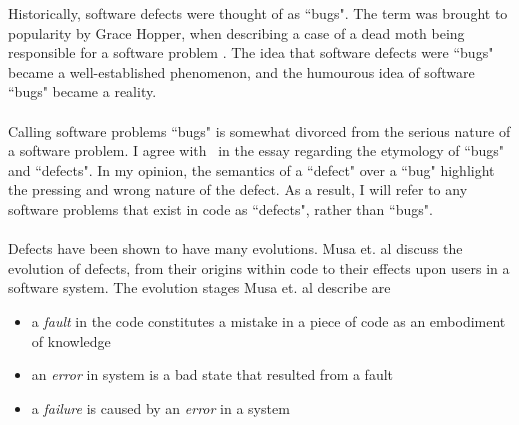 Historically, software defects were thought of as ``bugs".
The term was brought to popularity by Grace Hopper, when describing a case of a dead moth being
responsible for a software problem \FIXME.
The idea that software defects were ``bugs" became a well-established phenomenon, and the humourous
idea of software ``bugs" became a reality.\\
\\
Calling software problems ``bugs" is somewhat divorced from the serious nature of a software
problem.
I agree with \FIXME\ in the essay regarding the etymology of ``bugs" and ``defects".
In my opinion, the semantics of a ``defect" over a ``bug" highlight the pressing and wrong nature of the defect.
As a result, I will refer to any software problems that exist in code as ``defects", rather than
``bugs".\\
\\
Defects have been shown to have many evolutions.
Musa et. al \cite{musa1987software} discuss the evolution of defects, from their origins within
code to their effects upon users in a software system.
The evolution stages Musa et. al describe are
\begin{itemize}
	\item a {\em fault} in the code constitutes a mistake in a piece of code as an embodiment of
		knowledge
	\item an {\em error} in system is a bad state that resulted from a fault
	\item a {\em failure} is caused by an {\em error} in a system
\end{itemize}

